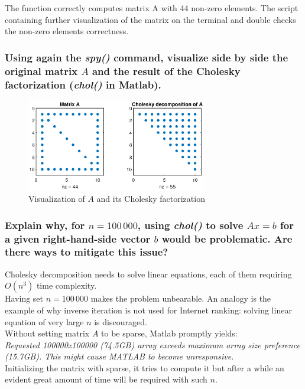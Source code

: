 \documentclass[unicode,11pt,a4paper,oneside,numbers=endperiod,openany]{scrartcl}
\begin{document}
The function correctly computes matrix A with 44 non-zero elements.
The script containing further visualization of the matrix on the terminal and
double checks the non-zero elements correctness.

\subsubsection{Using again the \textit{spy()} command, visualize side by side
    the original matrix $A$ and the result of the Cholesky factorization (\textit{chol()} in Matlab).}

\begin{figure}[H]
    \centering
    \includegraphics[width=0.7\textwidth]{figures/ex6p4_spy}
    \caption{Visualization of $A$ and its Cholesky factorization}
    \label{fig:ex6p4_spy}
\end{figure}

\subsubsection{Explain why, for $n = 100\,000$, using \textit{chol()} to solve $Ax = b$
    for a given right-hand-side vector $b$ would be problematic.
    Are there ways to mitigate this issue?}

Cholesky decomposition needs to solve linear equations, each of them requiring $O(n^3)$ time complexity. \\
Having set $n = 100\,000$ makes the problem unbearable.
An analogy is the example of why inverse iteration is not used for Internet ranking:
solving linear equation of very large $n$ is discouraged. \\
Without setting matrix $A$ to be sparse, Matlab promptly yields: \\

\textit{Requested 100000x100000 (74.5GB)
    array exceeds maximum array size preference (15.7GB).
    This might cause MATLAB to become unresponsive.} \\

Initializing the matrix with sparse, it tries to compute it but after a while
an evident great amount of time will be required with such $n$.  \\
\end{document}
